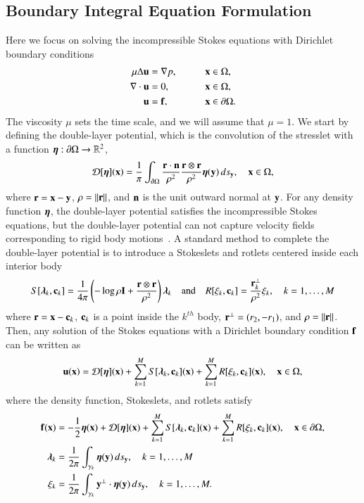 \documentclass[preprint, 10pt]{elsarticle}
\begin{document}
\subsection{Boundary Integral Equation Formulation} 
\label{sec:bies}
Here we focus on solving the incompressible Stokes equations with
Dirichlet boundary conditions
\begin{alignat*}{3}
  \mu\Delta {\mathbf{u}} &= {\nabla} p, \qquad && {\mathbf{x}} \in \Omega, \\
  {\nabla} \cdot {\mathbf{u}} &= 0,   && {\mathbf{x}} \in \Omega, \\
  {\mathbf{u}} &= {\mathbf{f}},  && {\mathbf{x}} \in {\partial}\Omega.
\end{alignat*}
The viscosity $\mu$ sets the time scale, and we will assume that
$\mu=1$.  We start by defining the double-layer potential, which is the
convolution of the stresslet with a function ${\boldsymbol\eta}:{\partial}\Omega
\rightarrow {\mathbb{R}}^2$,
\begin{align}
  {\mathcal{D}}[{\boldsymbol\eta}]({\mathbf{x}}) = \frac{1}{\pi} \int_{{\partial}\Omega} 
    \frac{{\mathbf{r}} \cdot {\mathbf{n}}}{\rho^2} \frac{{\mathbf{r}} \otimes {\mathbf{r}}}{\rho^2} 
    {\boldsymbol\eta}({\mathbf{y}}) \, ds_{\mathbf{y}}, \quad {\mathbf{x}} \in \Omega,
    \label{eqn:velocityDLP}
\end{align}
where ${\mathbf{r}} = {\mathbf{x}} - {\mathbf{y}}$, $\rho = \|{\mathbf{r}}\|$, and ${\mathbf{n}}$ is the unit outward
normal at ${\mathbf{y}}$.  For any density function ${\boldsymbol\eta}$, the double-layer
potential satisfies the incompressible Stokes equations, but the
double-layer potential can not capture velocity fields corresponding to
rigid body motions~\cite{pow-mir1987}.  A standard method to complete
the double-layer potential is to introduce a Stokeslets and rotlets
centered inside each interior body
\begin{align}
  S[{\boldsymbol\lambda}_k,{\mathbf{c}}_k] = \frac{1}{4\pi} \left(-\log \rho {\mathbf{I}} + 
    \frac{{\mathbf{r}} \otimes {\mathbf{r}}}{\rho^2} \right){\boldsymbol\lambda}_k
  \quad \text{and} \quad
  R[\xi_k,{\mathbf{c}}_k] = \frac{{\mathbf{r}}_k^\perp}{\rho^2}\xi_k, 
  \quad k=1,\ldots,M
  \label{eqn:stokeslet_rotlet}
\end{align}
where  ${\mathbf{r}} = {\mathbf{x}} - {\mathbf{c}}_k$, ${\mathbf{c}}_k$ is a point inside the $k^{th}$ body,
${\mathbf{r}}^\perp = (r_2,-r_1)$, and $\rho = \|{\mathbf{r}}\|$.  Then, any solution of
the Stokes equations with a Dirichlet boundary condition ${\mathbf{f}}$ can be
written as
\begin{align}
  \label{eqn:completed_DLP}
  {\mathbf{u}}({\mathbf{x}}) = {\mathcal{D}}[{\boldsymbol\eta}]({\mathbf{x}}) + \sum_{k=1}^{M} S[{\boldsymbol\lambda}_k,{\mathbf{c}}_k]({\mathbf{x}}) +
              \sum_{k=1}^{M} R[\xi_k,{\mathbf{c}}_k]({\mathbf{x}}), \quad {\mathbf{x}} \in \Omega,
\end{align}
where the density function, Stokeslets, and rotlets satisfy
\begin{subequations}
\label{eqn:completed_BIE}
\begin{align}
  {\mathbf{f}}({\mathbf{x}}) &= -\frac{1}{2}{\boldsymbol\eta}({\mathbf{x}}) + {\mathcal{D}}[{\boldsymbol\eta}]({\mathbf{x}}) + 
      \sum_{k=1}^{M} S[{\boldsymbol\lambda}_k,{\mathbf{c}}_k]({\mathbf{x}}) +
      \sum_{k=1}^{M} R[\xi_k,{\mathbf{c}}_k]({\mathbf{x}}), \quad {\mathbf{x}} \in {\partial}\Omega, 
      \label{eqn:DLP}\\
  {\boldsymbol\lambda}_k &= \frac{1}{2\pi}\int_{\gamma_k} {\boldsymbol\eta}({\mathbf{y}}) \, ds_{\mathbf{y}},
  \quad k=1,\ldots,M
  \label{eqn:stokeslet} \\
  \xi_k &= \frac{1}{2\pi}\int_{\gamma_k} {\mathbf{y}}^\perp \cdot {\boldsymbol\eta}({\mathbf{y}})
  \, ds_{\mathbf{y}}, \quad k=1,\ldots,M.
  \label{eqn:rotlet}
\end{align}
\end{subequations}
\end{document}
